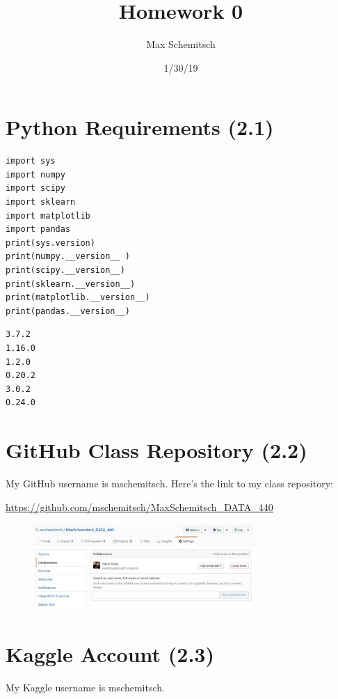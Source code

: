 \documentclass[a4paper]{article}
\title{Homework 0}
\author{Max Schemitsch}
\date{1/30/19}
\begin{document}
\lstset{language=Python}

\maketitle

\section{Python Requirements (2.1)}
\begin{lstlisting}[frame=single]
import sys
import numpy
import scipy
import sklearn
import matplotlib
import pandas
print(sys.version)
print(numpy.__version__ )
print(scipy.__version__) 
print(sklearn.__version__) 
print(matplotlib.__version__)
print(pandas.__version__)
\end{lstlisting}

\begin{lstlisting}
3.7.2
1.16.0
1.2.0
0.20.2
3.0.2
0.24.0
\end{lstlisting}

\section{GitHub Class Repository (2.2)}
My GitHub username is mschemitsch. Here's the link to my class repository:

\url{https://github.com/mschemitsch/MaxSchemitsch_DATA_440}

\begin{figure}[h]
  \begin{center}
    \includegraphics[width=0.75\textwidth]{github.pdf}
  \end{center}
\end{figure}


\section{Kaggle Account (2.3)}
My Kaggle username is mschemitsch.
\end{document}
